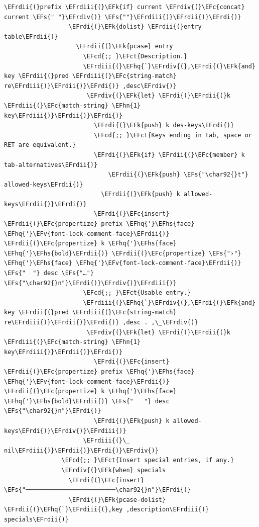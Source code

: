 \documentclass{scrartcl}
\newcommand{\EFk}[1]{\textcolor{EFk}{#1}} %
\newcommand{\EFs}[1]{\textcolor{EFs}{#1}} %
\newcommand{\EFct}[1]{\textcolor{EFct}{#1}} %
\newcommand{\EFc}[1]{\textcolor{EFc}{#1}} %
\newcommand{\EFv}[1]{\textcolor{EFv}{#1}} %
\newcommand{\EFcd}[1]{\textcolor{EFcd}{#1}} %
\newcommand{\EFhn}[1]{\textcolor{EFhn}{\textbf{#1}}} %
\newcommand{\EFhq}[1]{\textcolor{EFhq}{#1}} %
\newcommand{\EFhs}[1]{\textcolor{EFhs}{#1}} %
\newcommand{\EFrdi}[1]{\textcolor{EFrdi}{#1}} %
\newcommand{\EFrdii}[1]{\textcolor{EFrdii}{#1}} %
\newcommand{\EFrdiii}[1]{\textcolor{EFrdiii}{#1}} %
\newcommand{\EFrdiv}[1]{\textcolor{EFrdiv}{#1}} %
\begin{document}
\begin{Code}
\begin{Verbatim}[]
                      \EFrdii{(}prefix \EFrdiii{(}\EFk{if} current \EFrdiv{(}\EFc{concat} current \EFs{" "}\EFrdiv{)} \EFs{""}\EFrdiii{)}\EFrdii{)}\EFrdi{)}
                  \EFrdi{(}\EFk{dolist} \EFrdii{(}entry table\EFrdii{)}
                    \EFrdii{(}\EFk{pcase} entry
                      \EFcd{;; }\EFct{Description.}
                      \EFrdiii{(}\EFhq{`}\EFrdiv{(},\EFrdi{(}\EFk{and} key \EFrdii{(}pred \EFrdiii{(}\EFc{string-match} re\EFrdiii{)}\EFrdii{)}\EFrdi{)} ,desc\EFrdiv{)}
                       \EFrdiv{(}\EFk{let} \EFrdi{(}\EFrdii{(}k \EFrdiii{(}\EFc{match-string} \EFhn{1} key\EFrdiii{)}\EFrdii{)}\EFrdi{)}
                         \EFrdi{(}\EFk{push} k des-keys\EFrdi{)}
                         \EFcd{;; }\EFct{Keys ending in tab, space or RET are equivalent.}
                         \EFrdi{(}\EFk{if} \EFrdii{(}\EFc{member} k tab-alternatives\EFrdii{)}
                             \EFrdii{(}\EFk{push} \EFs{"\char92{}t"} allowed-keys\EFrdii{)}
                           \EFrdii{(}\EFk{push} k allowed-keys\EFrdii{)}\EFrdi{)}
                         \EFrdi{(}\EFc{insert} \EFrdii{(}\EFc{propertize} prefix \EFhq{'}\EFhs{face} \EFhq{'}\EFv{font-lock-comment-face}\EFrdii{)} \EFrdii{(}\EFc{propertize} k \EFhq{'}\EFhs{face} \EFhq{'}\EFhs{bold}\EFrdii{)} \EFrdii{(}\EFc{propertize} \EFs{"›"} \EFhq{'}\EFhs{face} \EFhq{'}\EFv{font-lock-comment-face}\EFrdii{)} \EFs{"  "} desc \EFs{"…"} \EFs{"\char92{}n"}\EFrdi{)}\EFrdiv{)}\EFrdiii{)}
                      \EFcd{;; }\EFct{Usable entry.}
                      \EFrdiii{(}\EFhq{`}\EFrdiv{(},\EFrdi{(}\EFk{and} key \EFrdii{(}pred \EFrdiii{(}\EFc{string-match} re\EFrdiii{)}\EFrdii{)}\EFrdi{)} ,desc . ,\_\EFrdiv{)}
                       \EFrdiv{(}\EFk{let} \EFrdi{(}\EFrdii{(}k \EFrdiii{(}\EFc{match-string} \EFhn{1} key\EFrdiii{)}\EFrdii{)}\EFrdi{)}
                         \EFrdi{(}\EFc{insert} \EFrdii{(}\EFc{propertize} prefix \EFhq{'}\EFhs{face} \EFhq{'}\EFv{font-lock-comment-face}\EFrdii{)} \EFrdii{(}\EFc{propertize} k \EFhq{'}\EFhs{face} \EFhq{'}\EFhs{bold}\EFrdii{)} \EFs{"   "} desc \EFs{"\char92{}n"}\EFrdi{)}
                         \EFrdi{(}\EFk{push} k allowed-keys\EFrdi{)}\EFrdiv{)}\EFrdiii{)}
                      \EFrdiii{(}\_ nil\EFrdiii{)}\EFrdii{)}\EFrdi{)}\EFrdiv{)}
                \EFcd{;; }\EFct{Insert special entries, if any.}
                \EFrdiv{(}\EFk{when} specials
                  \EFrdi{(}\EFc{insert} \EFs{"─────────────────────────\char92{}n"}\EFrdi{)}
                  \EFrdi{(}\EFk{pcase-dolist} \EFrdii{(}\EFhq{`}\EFrdiii{(},key ,description\EFrdiii{)} specials\EFrdii{)}

\end{Verbatim}
\end{Code}
\end{document}
